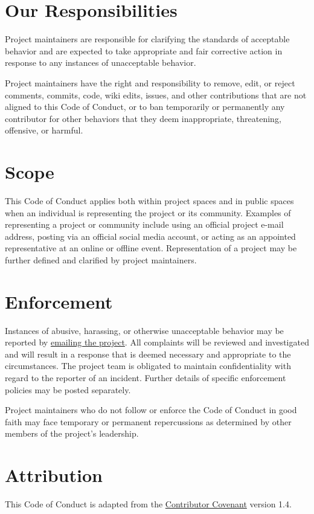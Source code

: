 \section{Our Responsibilities}\label{our-responsibilities-1}

Project maintainers are responsible for clarifying the standards of
acceptable behavior and are expected to take appropriate and fair
corrective action in response to any instances of unacceptable
behavior.

Project maintainers have the right and responsibility to remove, edit,
or reject comments, commits, code, wiki edits, issues, and other
contributions that are not aligned to this Code of Conduct, or to ban
temporarily or permanently any contributor for other behaviors that
they deem inappropriate, threatening, offensive, or harmful.

\section{Scope}\label{scope-1}

This Code of Conduct applies both within project spaces and in public
spaces when an individual is representing the project or its
community. Examples of representing a project or community include
using an official project e-mail address, posting via an official
social media account, or acting as an appointed representative at an
online or offline event. Representation of a project may be further
defined and clarified by project maintainers.

\section{Enforcement}\label{enforcement-1}

Instances of abusive, harassing, or otherwise unacceptable behavior
may be reported by \href{mailto:gvwilson@third-bit.com}{emailing the project}. All
complaints will be reviewed and investigated and will result in a
response that is deemed necessary and appropriate to the
circumstances. The project team is obligated to maintain
confidentiality with regard to the reporter of an incident. Further
details of specific enforcement policies may be posted separately.

Project maintainers who do not follow or enforce the Code of Conduct
in good faith may face temporary or permanent repercussions as
determined by other members of the project's leadership.

\section{Attribution}\label{attribution}

This Code of Conduct is adapted from
the \href{https://www.contributor-covenant.org}{Contributor Covenant} version 1.4.
